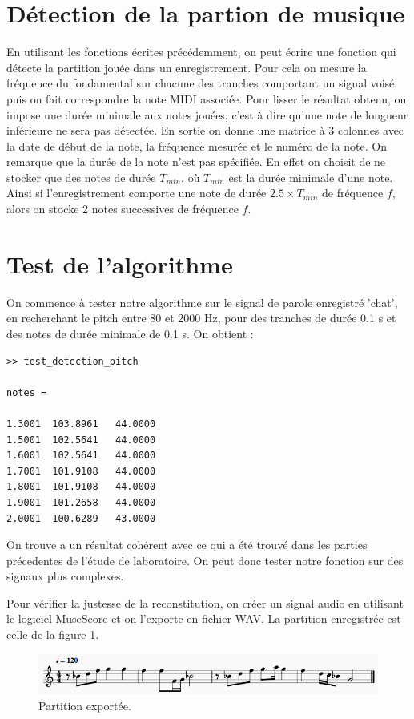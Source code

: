 \documentclass[french]{article}
\begin{document}
\section{Détection de la partion de musique}

En utilisant les fonctions écrites précédemment, on peut écrire une fonction qui détecte la partition jouée dans un enregistrement. Pour cela on mesure la fréquence du fondamental sur chacune des tranches comportant un signal voisé, puis on fait correspondre la note MIDI associée. Pour lisser le résultat obtenu, on impose une durée minimale aux notes jouées, c'est à dire qu'une note de longueur inférieure ne sera pas détectée. En sortie on donne une matrice à 3 colonnes avec la date de début de la note, la fréquence mesurée et le numéro de la note. On remarque que la durée de la note n'est pas spécifiée. En effet on choisit de ne stocker que des notes de durée $T_{min}$, où $T_{min}$ est la durée minimale d'une note. Ainsi si l'enregistrement comporte une note de durée $2.5\times T_{min}$ de fréquence $f$, alors on stocke 2 notes successives de fréquence $f$.

\section{Test de l'algorithme}

On commence à tester notre algorithme sur le signal de parole enregistré 'chat', en recherchant le pitch entre 80 et 2000 Hz, pour des tranches de durée 0.1 s et des notes de durée minimale de 0.1 s. On obtient :

\begin{lstlisting}
>> test_detection_pitch

notes =

1.3001  103.8961   44.0000
1.5001  102.5641   44.0000
1.6001  102.5641   44.0000
1.7001  101.9108   44.0000
1.8001  101.9108   44.0000
1.9001  101.2658   44.0000
2.0001  100.6289   43.0000
\end{lstlisting}

On trouve a un résultat cohérent avec ce qui a été trouvé dans les parties précedentes de l'étude de laboratoire. On peut donc tester notre fonction sur des signaux plus complexes.

Pour vérifier la justesse de la reconstitution, on créer un signal audio en utilisant le logiciel MuseScore et on l'exporte en fichier WAV. La partition enregistrée est celle de la figure \ref{fig:partition}.

\begin{figure}[h!]
	\centering
	\includegraphics[width=\textwidth]{images/partition.png}
	\caption{Partition exportée.}
	\label{fig:partition}
\end{figure}
\end{document}
